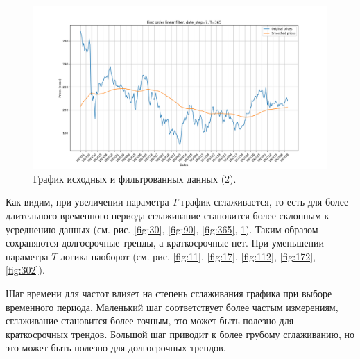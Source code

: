 \documentclass[a4paper, 12pt]{article}
\begin{document}
    \begin{figure}[H]
        \centering
        \includegraphics[scale=0.35]{2_365.png}
        \captionsetup{skip=0pt}
        \caption{График исходных и фильтрованных данных (2).}
        \label{fig:3652}
    \end{figure}


    Как видим, при увеличении параметра $T$ график сглаживается, то есть для более длительного временного периода
    сглаживание становится более склонным к усреднению данных (см. рис. \ref{fig:30}, \ref{fig:90}, \ref{fig:365},
    \ref{fig:3652}). Таким образом сохраняются долгосрочные тренды, а краткосрочные нет. При уменьшении параметра $T$ логика наоборот
    (см. рис. \ref{fig:11}, \ref{fig:17}, \ref{fig:112}, \ref{fig:172}, \ref{fig:302}).


    Шаг времени для частот влияет на степень сглаживания графика при выборе временного периода. Маленький шаг соответствует
    более частым измерениям, сглаживание становится более точным, это может быть полезно для краткосрочных трендов.
    Большой шаг приводит к более грубому сглаживанию, но это может быть полезно для долгосрочных трендов.
\end{document}

